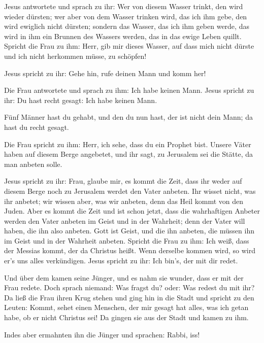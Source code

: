  Jesus antwortete und sprach zu ihr: Wer von diesem
Wasser trinkt, den wird wieder dürsten;  wer aber von dem
Wasser trinken wird, das ich ihm gebe, den wird ewiglich nicht dürsten;
sondern das Wasser, das ich ihm geben werde, das wird in ihm ein Brunnen
des Wassers werden, das in das ewige Leben quillt. 
Spricht die Frau zu ihm: Herr, gib mir dieses Wasser, auf dass mich
nicht dürste und ich nicht herkommen müsse, zu schöpfen!

 Jesus spricht zu ihr: Gehe hin, rufe deinen Mann und
komm her!

 Die Frau antwortete und sprach zu ihm: Ich habe keinen
Mann. Jesus spricht zu ihr: Du hast recht gesagt: Ich habe keinen Mann.

 Fünf Männer hast du gehabt, und den du nun hast, der ist
nicht dein Mann; da hast du recht gesagt.

 Die Frau spricht zu ihm: Herr, ich sehe, dass du ein
Prophet bist.  Unsere Väter haben auf diesem Berge
angebetet, und ihr sagt, zu Jerusalem sei die Stätte, da man anbeten
solle.

 Jesus spricht zu ihr: Frau, glaube mir, es kommt die
Zeit, dass ihr weder auf diesem Berge noch zu Jerusalem werdet den Vater
anbeten.  Ihr wisset nicht, was ihr anbetet; wir wissen
aber, was wir anbeten, denn das Heil kommt von den Juden.
 Aber es kommt die Zeit und ist schon jetzt, dass die
wahrhaftigen Anbeter werden den Vater anbeten im Geist und in der
Wahrheit; denn der Vater will haben, die ihn also anbeten.
 Gott ist Geist, und die ihn anbeten, die müssen ihn im
Geist und in der Wahrheit anbeten.  Spricht die Frau zu
ihm: Ich weiß, dass der Messias kommt, der da Christus heißt. Wenn
derselbe kommen wird, so wird er's uns alles verkündigen.
 Jesus spricht zu ihr: Ich bin's, der mit dir redet.

 Und über dem kamen seine Jünger, und es nahm sie wunder,
dass er mit der Frau redete. Doch sprach niemand: Was fragst du? oder:
Was redest du mit ihr?  Da ließ die Frau ihren Krug
stehen und ging hin in die Stadt und spricht zu den Leuten:
 Kommt, sehet einen Menschen, der mir gesagt hat alles,
was ich getan habe, ob er nicht Christus sei!  Da gingen
sie aus der Stadt und kamen zu ihm.

 Indes aber ermahnten ihn die Jünger und sprachen: Rabbi,
iss!

